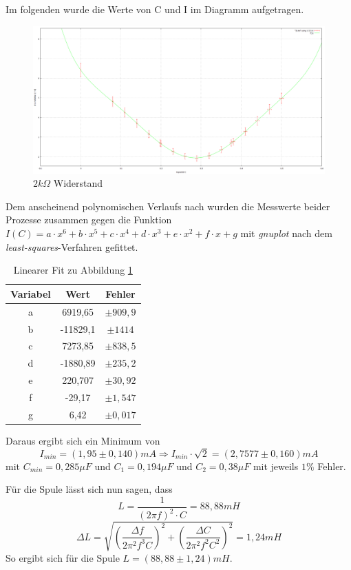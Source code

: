 Im folgenden wurde die Werte von C und I im Diagramm aufgetragen.
\begin{figure}[]
  \centering
  \includegraphics[width=.9\textwidth]{2k.png}
  \caption{$2k\Omega$ Widerstand}
  \label{fig:2k}
\end{figure}

Dem anscheinend polynomischen Verlaufs nach wurden die Messwerte beider Prozesse zusammen gegen die Funktion $I(C)=a\cdot x^6+b\cdot x^5+c\cdot x^4+d\cdot x^3+e\cdot x^2+f\cdot x+g$ mit \emph{gnuplot} nach dem \emph{least-squares}-Verfahren gefittet.
\begin{table}[H]
  \centering
  \begin{tabular}{c | c | c }
    Variabel & Wert & Fehler\\ \hline
    a  & 6919,65 & $\pm 909,9$\\
    b & -11829,1 & $\pm1414$\\
    c  & 7273,85 & $\pm 838,5$\\
    d  & -1880,89 & $\pm235,2$\\
    e  & 220,707& $\pm 30,92$\\
    f  & -29,17 & $\pm 1,547$\\
    g  & 6,42 & $\pm 0,017$\\
  \end{tabular}
  \caption{Linearer Fit zu Abbildung \ref{fig:2k}}
  \label{tab:fit2k}
\end{table}

Daraus ergibt sich ein Minimum von
\begin{equation}
I_{min}=(1,95\pm 0,140)mA \Rightarrow I_{min}\cdot \sqrt{2}=(2,7577\pm0,160)mA
\end{equation}
mit $C_{min}=0,285 \mu F$ und $C_{1}=0,194 \mu F$ und $C_{2}=0,38 \mu F$ mit jeweils $1\%$ Fehler.

Für die Spule lässt sich nun sagen, dass
\begin{equation}
L=\frac{1}{(2\pi f)^2\cdot C}=88,88mH
\end{equation}
\begin{equation}
\Delta L =\sqrt{(\frac{\Delta f}{2\pi^2 f^3 C})^2+(\frac{\Delta C}{2\pi^2 f^2 C^2})^2}=1,24mH
\end{equation}
So ergibt sich für die Spule $L=(88,88 \pm 1,24)mH$.


